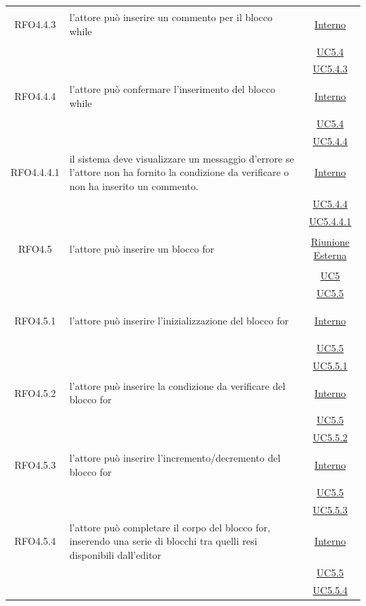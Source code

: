 \begin{itemize}
\begin{itemize}
\begin{itemize}
\begin{itemize}
\begin{longtable}{|c|>{\centering}m{7cm}|c|}
\hypertarget{RFO4.4.3}{RFO4.4.3} & l'attore può inserire un commento per il blocco while & \hyperlink{Interno}{Interno}\\
& &\hyperref[UC5.4]{UC5.4}\\
& &\hyperref[UC5.4.3]{UC5.4.3}\\ \hline

\hypertarget{RFO4.4.4}{RFO4.4.4} & l'attore può confermare l'inserimento del blocco while & \hyperlink{Interno}{Interno}\\
& &\hyperref[UC5.4]{UC5.4}\\
& &\hyperref[UC5.4.4]{UC5.4.4}\\ \hline

\hypertarget{RFO4.4.4.1}{RFO4.4.4.1} & il sistema deve visualizzare un messaggio d'errore se l'attore non ha fornito la condizione da verificare o non ha inserito un commento. &\hyperlink{Interno}{Interno}\\
& &\hyperref[UC5.4.4]{UC5.4.4}\\
& &\hyperref[UC5.4.4.1]{UC5.4.4.1}\\ \hline

\hypertarget{RFO4.5}{RFO4.5} & l'attore può inserire un blocco for &  \hyperlink{Riunione Esterna}{Riunione Esterna}\\
& &\hyperref[UC5]{UC5}\\
& &\hyperref[UC5.5]{UC5.5}\\ \hline

\hypertarget{RFO4.5.1}{RFO4.5.1} & l'attore può inserire l'inizializzazione del blocco for & \hyperlink{Interno}{Interno}\\
& &\hyperref[UC5.5]{UC5.5}\\
& &\hyperref[UC5.5.1]{UC5.5.1}\\ \hline

\hypertarget{RFO4.5.2}{RFO4.5.2} & l'attore può inserire la condizione da verificare del blocco for & \hyperlink{Interno}{Interno}\\
& &\hyperref[UC5.5]{UC5.5}\\
& &\hyperref[UC5.5.2]{UC5.5.2}\\ \hline

\hypertarget{RFO4.5.3}{RFO4.5.3} & l'attore può inserire l'incremento/decremento del blocco for & \hyperlink{Interno}{Interno}\\
& &\hyperref[UC5.5]{UC5.5}\\
& &\hyperref[UC5.5.3]{UC5.5.3}\\ \hline

\hypertarget{RFO4.5.4}{RFO4.5.4} & l'attore può completare il corpo del blocco for, inserendo una serie di blocchi tra quelli resi disponibili dall'editor  &\hyperlink{Interno}{Interno}\\
& &\hyperref[UC5.5]{UC5.5}\\
& &\hyperref[UC5.5.4]{UC5.5.4}\\ \hline


\end{longtable}
\end{itemize}
\end{itemize}
\end{itemize}
\end{itemize}
